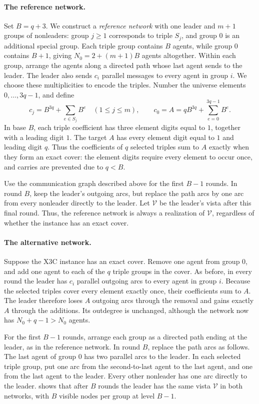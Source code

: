 \documentclass[11pt]{article}
\begin{document}
\paragraph{The reference network.}
Set \(B=q+3\).
We construct a \emph{reference network} with one leader and \(m+1\) groups of
nonleaders: group \(j\geq 1\) corresponds to triple \(S_j\), and group
\(0\) is an additional special group.
Each triple group contains \(B\) agents, while group \(0\) contains
\(B+1\), giving \(N_0=2+(m+1)B\) agents altogether.
Within each group, arrange the agents along a directed path whose
last agent sends to the leader.
The leader also sends \(c_i\) parallel messages to every agent in
group \(i\). We choose these multiplicities to encode the triples.
Number the universe elements \(0,\ldots,3q-1\), and define
\[
 c_j=B^{3q}+\sum_{e\in S_j}B^e
 \quad(1\leq j\leq m),
 \qquad
 c_0=A=qB^{3q}+\sum_{e=0}^{3q-1}B^e.
\]
In base \(B\), each triple coefficient has three element digits
equal to \(1\), together with a leading digit \(1\).
The target \(A\) has every element digit equal to \(1\) and
leading digit \(q\).
Thus the coefficients of \(q\) selected triples sum to \(A\)
exactly when they form an exact cover: the element digits require
every element to occur once, and carries are prevented due to \(q<B\).

Use the communication graph described above for the first \(B-1\) rounds.
In round \(B\), keep the leader's outgoing arcs, but replace the
path arcs by one arc from every nonleader directly to the leader.
Let \(\mathcal V\) be the leader's vista after this final round.
Thus, the reference network is always a realization of $\mathcal V$, regardless of whether the instance has an exact cover.

\paragraph{The alternative network.}
Suppose the \textsc{X3C} instance has an exact cover.
Remove one agent from group \(0\), and add one agent to each
of the \(q\) triple groups in the cover.
As before, in every round the leader has \(c_i\) parallel
outgoing arcs to every agent in group \(i\).
Because the selected triples cover every element exactly once,
their coefficients sum to \(A\).
The leader therefore loses \(A\) outgoing arcs through the
removal and gains exactly \(A\) through the additions.
Its outdegree is unchanged, although the network now has
\(N_0+q-1>N_0\) agents.

For the first \(B-1\) rounds, arrange each group as a directed
path ending at the leader, as in the reference network.
In round \(B\), replace the path arcs as follows.
The last agent of group \(0\) has two parallel arcs to the leader.
In each selected triple group, put one arc from the second-to-last
agent to the last agent, and one from the last agent to the leader.
Every other nonleader has one arc directly to the leader.  shows that after \(B\) rounds the leader
has the same vista \(\mathcal V\) in both networks, with \(B\)
visible nodes per group at level \(B-1\).
\end{document}
